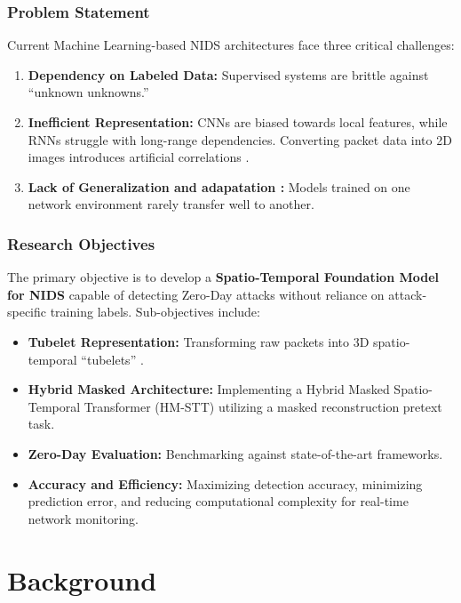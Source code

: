 \documentclass[12pt, a4paper]{report}
\begin{document}
\section*{Problem Statement}
Current Machine Learning-based NIDS architectures face three critical challenges:
\begin{enumerate}
    \item \textbf{Dependency on Labeled Data:} Supervised systems are brittle against ``unknown unknowns.''
    \item \textbf{Inefficient Representation:} CNNs are biased towards local features, while RNNs struggle with long-range dependencies. Converting packet data into 2D images introduces artificial correlations \cite{luisbisbe2024nopictures}.
    \item \textbf{Lack of Generalization and adapatation :} Models trained on one network environment rarely transfer well to another.

   
\end{enumerate}

\section*{Research Objectives}
The primary objective is to develop a \textbf{Spatio-Temporal Foundation Model for NIDS} capable of detecting Zero-Day attacks without reliance on attack-specific training labels. Sub-objectives include:
\begin{itemize}
    \item \textbf{Tubelet Representation:} Transforming raw packets into 3D spatio-temporal ``tubelets'' \cite{bertasius2021space}.
    \item \textbf{Hybrid Masked Architecture:} Implementing a Hybrid Masked Spatio-Temporal Transformer (HM-STT) utilizing a masked reconstruction pretext task.
    \item \textbf{Zero-Day Evaluation:} Benchmarking against state-of-the-art frameworks.
    \item \textbf{Accuracy and Efficiency:}  Maximizing detection accuracy, minimizing prediction error, and reducing computational complexity for real-time network monitoring.
\end{itemize}

\part{Background}
\end{document}

